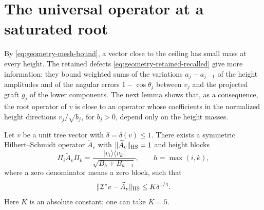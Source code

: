 \section{The universal operator at a saturated root}

By \eqref{eq:geometry-mesh-bound}, a vector close to the ceiling has small mass at every height. The retained defects \eqref{eq:geometry-retained-recalled} give more information: they bound weighted sums of the variations $a_j-a_{j-1}$ of the height amplitudes and of the angular errors $1-\cos\theta_j$ between $v_j$ and the projected graft $g_j$ of the lower components. The next lemma shows that, as a consequence, the root operator of $v$ is close to an operator whose coefficients in the normalized height directions $v_j/\sqrt{b_j}$, for $b_j>0$, depend only on the height masses.

\begin{lemma}
\label{lem:geometry-coherent-root}
Let $v$ be a unit tree vector with $\delta=\delta(v)\le1$. There exists a symmetric Hilbert--Schmidt operator $\widetilde A_v$ with $\lVert\widetilde A_v\rVert_{\mathrm{HS}}=1$ and height blocks
\begin{equation}
 \Pi_i\widetilde A_v\Pi_k
 =\frac{|v_i\rangle\langle v_k|}{\sqrt{B_h+B_{h-1}}},\qquad h=\max(i,k),
 \label{eq:geometry-coherent-root-blocks}
\end{equation}
where a zero denominator means a zero block, such that
\begin{equation}
 \lVert\mathcal I^*v-\widetilde A_v\rVert_{\mathrm{HS}}\le K\delta^{1/4}.
 \label{eq:geometry-coherent-root-error}
\end{equation}
Here $K$ is an absolute constant; one can take $K=5$.
\end{lemma}

